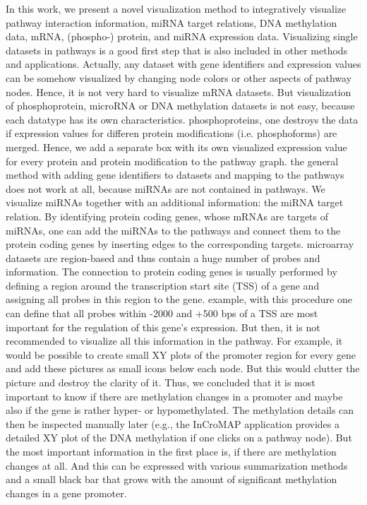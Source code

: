 \documentclass{bioinfo}
\begin{document}
In this work, we present a novel visualization method to integratively visualize pathway interaction
information, miRNA target relations, DNA methylation data, mRNA, (phospho-) protein, and miRNA
expression data. Visualizing single datasets in pathways is a good first step that is also included
in other methods and applications. Actually, any dataset with gene identifiers and expression values
can be somehow visualized by changing node colors or other aspects of pathway nodes. Hence, it is
not very hard to visualize mRNA datasets. But visualization of phosphoprotein, microRNA or DNA
methylation datasets is not easy, because each datatype has its own characteristics.  %
phosphoproteins, one destroys the data if expression values for differen protein modifications
(i.e. phosphoforms) are merged. Hence, we add a separate box with its own visualized expression
value for every protein and protein modification to the pathway graph.  %
the general method with adding gene identifiers to datasets and mapping to the pathways does not
work at all, because miRNAs are not contained in pathways. We visualize miRNAs together with an
additional information: the miRNA target relation. By identifying protein coding genes, whose mRNAs
are targets of miRNAs, one can add the miRNAs to the pathways and connect them to the protein coding
genes by inserting edges to the corresponding targets.  %
microarray datasets are region-based and thus contain a huge number of probes and information. The
connection to protein coding genes is usually performed by defining a region around the
transcription start site (TSS) of a gene and assigning all probes in this region to the gene.  %
example, with this procedure one can define that all probes within -2000 and +500 bps of a TSS are
most important for the regulation of this gene's expression.  But then, it is not recommended to
visualize all this information in the pathway. For example, it would be possible to create small XY
plots of the promoter region for every gene and add these pictures as small icons below each
node. But this would clutter the picture and destroy the clarity of it. Thus, we concluded that it
is most important to know if there are methylation changes in a promoter and maybe also if the gene
is rather hyper- or hypomethylated. The methylation details can then be inspected manually later
(e.g., the InCroMAP application provides a detailed XY plot of the DNA methylation if one clicks on
a pathway node). But the most important information in the first place is, if there are methylation
changes at all. And this can be expressed with various summarization methods and a small black bar
that grows with the amount of significant methylation changes in a gene promoter. 
\end{document}
